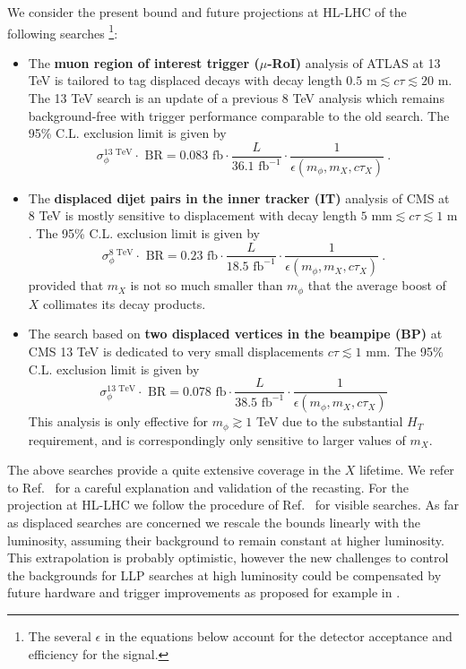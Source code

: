 We consider the present bound and future projections at HL-LHC of the following searches \footnote{The several $\epsilon$ in the equations below account for the detector acceptance and efficiency for the signal.}:
\begin{itemize}
\item The {\bf muon region of interest trigger ($\mu$-RoI)}  analysis of  ATLAS at 13 TeV \cite{Aaboud:2018aqj} is tailored to tag displaced decays with decay length $0.5\text{ m}\lesssim c\tau\lesssim 20\text{ m}$. The 13 TeV search is an update of a previous 8 TeV analysis \cite{Aad:2015uaa} which remains background-free with trigger performance comparable to the old search. The 95\% C.L. exclusion limit is given by 
\begin{equation}
\sigma_\phi^{13\text{ TeV}}\cdot\text{ BR}=  0.083\text{ fb}\cdot \frac{L}{36.1\text{ fb}^{-1}}\cdot \frac{1}{\epsilon(m_\phi,m_X,c\tau_X)}\ .
\end{equation}
\item The { \bf displaced dijet pairs in the inner tracker (IT)} analysis of CMS at 8 TeV \cite{CMS:2014wda} is mostly sensitive to displacement with decay length $\text{5 mm}\lesssim c\tau\lesssim 1 \text{ m}$. The 95\% C.L. exclusion limit is given by 
\begin{equation} 
\sigma_\phi^{8\text{ TeV}}\cdot\text{ BR}= 0.23\text{ fb}\cdot \frac{L}{18.5\text{ fb}^{-1}}\cdot \frac{1}{\epsilon(m_\phi,m_X,c\tau_X)} \ .
\end{equation}
provided that $m_X$ is not so much smaller than $m_\phi$ that the average boost of $X$ collimates its decay products.
\item The search based on { \bf two  displaced vertices in the beampipe (BP)} at CMS 13 TeV \cite{Sirunyan:2018pwn} is dedicated to very small displacements $c\tau\lesssim 1\text{ mm}$. The 95\% C.L. exclusion limit is given by 
\begin{equation}
\sigma_\phi^{13\text{ TeV}}\cdot\text{ BR}= 0.078\text{ fb}\cdot \frac{L}{38.5\text{ fb}^{-1}}\cdot \frac{1}{\epsilon(m_\phi,m_X,c\tau_X)}
\end{equation}
This analysis is only effective for $m_\phi \gtrsim 1$ TeV due to the substantial $H_T$ requirement, and is correspondingly only sensitive to larger values of $m_X$.
\end{itemize}
The above searches provide a quite extensive coverage in the $X$ lifetime. We refer to Ref.~\cite{Alipour-fard:2018mre} for a careful explanation and validation of the recasting. For the projection at HL-LHC we follow the procedure of Ref.~\cite{Thamm:2015zwa,Buttazzo:2015bka} for visible searches. As far as displaced searches are concerned we rescale the bounds linearly with the luminosity, assuming their background to remain constant at higher luminosity. This extrapolation is probably optimistic, however the new challenges to control the backgrounds for LLP searches at high luminosity could be compensated  by future hardware and trigger improvements as proposed for example in \cite{Gershtein:2017tsv,Liu:2018wte}.

